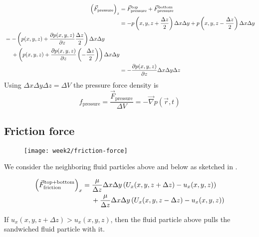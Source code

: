 \begin{align}
\left(\vec{F}_\mathrm{pressure}\right)_z &= \vec{F}_\mathrm{pressure}^\mathrm{top} + \vec{F}_\mathrm{pressure}^\mathrm{bottom}\\
&= -p\left(x,y,z+\frac{\Delta z}{2}\right)\Delta x \Delta y + p\left(x,y,z-\frac{\Delta z}{2}\right)\Delta x \Delta y \\
\begin{split}&= -\left(p(x,y,z)+\frac{\partial p(x,y,z)}{\partial z}\frac{\Delta z}{2}\right)\Delta x \Delta y\\
&\hspace{4.5mm}+ \left(p(x,y,z)+\frac{\partial p(x,y,z)}{\partial z}\left(-\frac{\Delta z}{2}\right)\right)\Delta x \Delta y
\end{split}\\
&= -\frac{\partial p(x,y,z)}{\partial z} \Delta x \Delta y \Delta z
\end{align}
Using $\Delta x \Delta y \Delta z = \Delta V$ the pressure force density is
\begin{equation}
f_\mathrm{pressure} = \frac{\vec{F}_\mathrm{pressure}}{\Delta V} = -\vec{\nabla}p(\vec{r},t)
\end{equation}


\subsection{Friction force}
\begin{figure}[!h]
    \centering
    \texttt{[image: week2/friction-force]}
    \caption{}
    \label{fig:friction-force}
\end{figure}

We consider the neighboring fluid particles above and below as sketched in .

\begin{equation}
\begin{split}
\left(\vec{F}_\mathrm{friction}^\mathrm{top+bottom}\right)_x &= \frac{\mu}{\Delta z}\Delta x \Delta y \left(U_x(x,y,z+\Delta z)-u_x(x,y,z)\right) \\
&\hspace{4.5mm}+ \frac{\mu}{\Delta z}\Delta x \Delta y \left(U_x(x,y,z-\Delta z)-u_x(x,y,z)\right)
\end{split}
\end{equation}

If $u_x(x,y,z+\Delta z)>u_x(x,y,z)$, then the fluid particle above pulls the sandwiched fluid particle with it.

